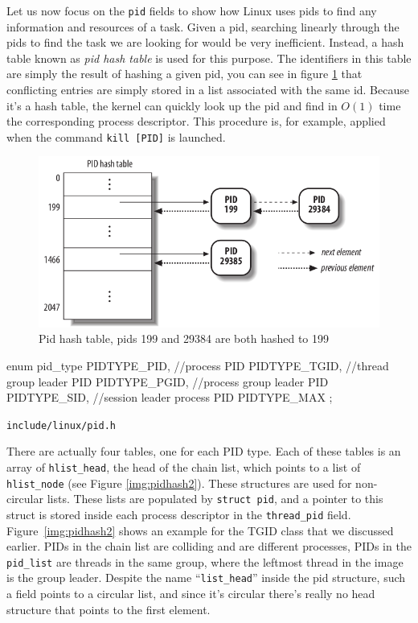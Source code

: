 \documentclass[10pt, oneside]{book}
\begin{document}
Let us now focus on the \texttt{pid} fields to show how Linux uses
pids to find any information and resources of a task. Given a pid,
searching linearly through the pids to find the task we are looking
for would be very inefficient. Instead, a hash table known as
\textit{pid hash table} is used for this purpose. The identifiers in
this table are simply the result of hashing a given pid, you can see
in figure \ref{img:pidhash1} that conflicting entries are simply
stored in a list associated with the same id. Because it's a hash
table, the kernel can quickly look up the pid and find in $O(1)$ time
the corresponding process descriptor. This procedure is, for example,
applied when the command \verb|kill [PID]| is launched.

\begin{figure}[ht]
\includegraphics[width=\textwidth]{images/pidhash1.png}
\caption{Pid hash table, pids 199 and 29384 are both hashed to 199}
\label{img:pidhash1}
\end{figure}

\begin{code}
enum pid_type {
  PIDTYPE_PID,  //process PID
  PIDTYPE_TGID, //thread group leader PID
  PIDTYPE_PGID, //process group leader PID
  PIDTYPE_SID,  //session leader process PID
  PIDTYPE_MAX
};
\end{code}
\verb|include/linux/pid.h|

There are actually four tables, one for each PID type. Each of these tables is an array of \verb|hlist_head|, the head of the chain list, which points to a list of \verb|hlist_node| (see Figure \ref{img:pidhash2}). These  structures are used for non-circular lists. These lists are populated by \verb|struct pid|, and a pointer to this struct is stored inside each process descriptor in the \verb|thread_pid| field. Figure~\ref{img:pidhash2} shows an example for the TGID class that we discussed earlier. PIDs in the chain list are colliding and are different processes, PIDs in the \verb|pid_list| are threads in the same group, where the leftmost thread in the image is the group leader. Despite the name ``\verb|list_head|'' inside the pid structure, such a field points to a circular list, and since it's circular there's really no head structure that points to the first element. %
\end{document}
